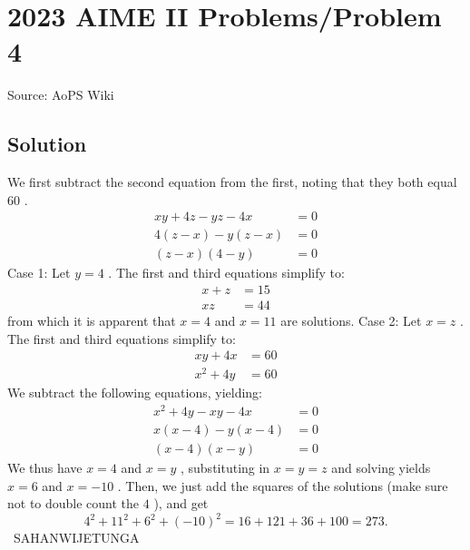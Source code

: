 \documentclass[12pt]{article}
\begin{document}
\section*{{2023 AIME II Problems/Problem 4}}
Source: AoPS Wiki

\subsection*{Solution}
We first subtract the second equation from the first, noting that they both equal $60$ . \begin{align*} xy+4z-yz-4x&=0 \\ 4(z-x)-y(z-x)&=0 \\ (z-x)(4-y)&=0 \end{align*} Case 1: Let $y=4$ . The first and third equations simplify to: \begin{align*} x+z&=15 \\ xz&=44 \end{align*} from which it is apparent that $x=4$ and $x=11$ are solutions. Case 2: Let $x=z$ . The first and third equations simplify to: \begin{align*} xy+4x&=60 \\ x^2+4y&=60 \end{align*} We subtract the following equations, yielding: \begin{align*} x^2+4y-xy-4x&=0 \\ x(x-4)-y(x-4)&=0 \\ (x-4)(x-y)&=0 \end{align*} We thus have $x=4$ and $x=y$ , substituting in $x=y=z$ and solving yields $x=6$ and $x=-10$ . Then, we just add the squares of the solutions (make sure not to double count the $4$ ), and get \[4^2+11^2+6^2+(-10)^2=16+121+36+100=\boxed{273}.\] ~SAHANWIJETUNGA
\end{document}
